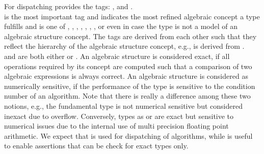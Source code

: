 For dispatching  provides the tags:  
,  and . \\ 
 is the most important tag and indicates the most refined 
algebraic concept a type fulfills and is one of 
, , ,
, , ,
,  or even  
in case the type is not a model of an algebraic structure concept. The tags are derived 
from each other such that they reflect the hierarchy of the algebraic 
structure concept,  e.g.,  is derived from . \\

 and  are both either  or .
An algebraic structure is considered exact,
if all operations required by its concept are computed such that a comparison 
of two algebraic expressions is always correct.
An algebraic structure is  considered as numerically sensitive,
if the performance of the type is sensitive to the condition number of an algorithm.
Note that there is really a difference among these two notions, e.g., the fundamental type  
is not numerical sensitive but considered inexact due to overflow. 
Conversely, types as  or  are exact but sensitive 
to numerical issues due to the internal use of multi precision floating point arithmetic.
We expect that  is used for dispatching of algorithms, 
while  is useful to enable assertions that can be check for exact types only.

